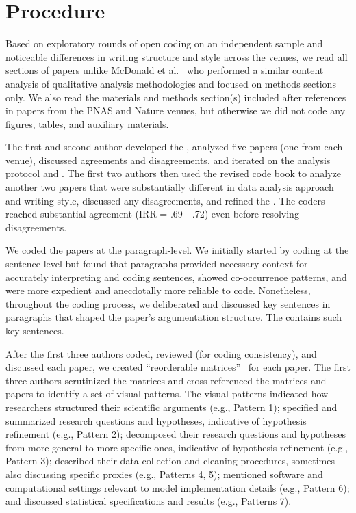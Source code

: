 \section{Procedure} \label{appendix:contentAnalysisProcedure}
Based on exploratory rounds of open coding on an independent sample and
noticeable differences in writing structure and style across the venues, we read
all sections of papers unlike McDonald et al.~\cite{mcdonald2019reliability} who
performed a similar content analysis of qualitative analysis methodologies and
focused on methods sections only. We also read the materials and methods section(s)
included after references in papers from the PNAS and Nature venues, but
otherwise we did not code any figures, tables, and auxiliary materials. 

The first and second author developed the \codebook, analyzed five papers (one
from each venue), discussed agreements and disagreements, and iterated on the
analysis protocol and \codebook. The first two authors then used the revised code
book to analyze another two papers that were substantially different in data
analysis approach and writing style, discussed any disagreements, and refined
the \codebook. The coders reached substantial agreement (IRR = .69 - .72) even
before resolving disagreements. 

We coded the papers at the paragraph-level. We initially started by coding at
the sentence-level but found that paragraphs provided necessary context for
accurately interpreting and coding sentences, showed co-occurrence patterns, and
were more expedient and anecdotally more reliable to code. Nonetheless,
throughout the coding process, we deliberated and discussed key sentences in
paragraphs that shaped the paper's argumentation structure. The \codebook
contains such key sentences. 

After the first three authors coded, reviewed (for coding consistency), and
discussed each paper, we created ``reorderable
matrices''~\cite{bertin2011graphics} for each paper. The first three authors
scrutinized the matrices and cross-referenced the matrices and papers to
identify a set of visual patterns. The visual patterns indicated how researchers
structured their scientific arguments (e.g., Pattern 1); specified and
summarized research questions and hypotheses, indicative of hypothesis
refinement (e.g., Pattern 2); decomposed their research questions and hypotheses
from more general to more specific ones, indicative of hypothesis refinement
(e.g., Pattern 3); described their data collection and cleaning procedures,
sometimes also discussing specific proxies (e.g., Patterns 4, 5); mentioned
software and computational settings relevant to model implementation details
(e.g., Pattern 6); and discussed statistical specifications and results (e.g.,
Patterns 7). 

